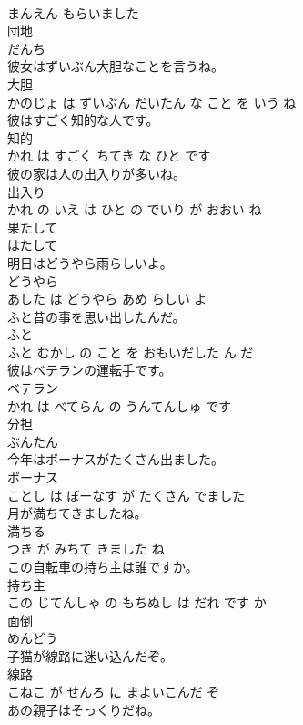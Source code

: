 \documentclass[8pt]{extreport}
\begin{document}
\begin{CJK}{UTF8}{min}
\\	まんえん もらいました			
\\	団地	
\\	だんち		
\\	彼女はずいぶん大胆なことを言うね。	
\\	大胆 
\\	かのじょ は ずいぶん だいたん な こと を いう ね			
\\	彼はすごく知的な人です。	
\\	知的 
\\	かれ は すごく ちてき な ひと です			
\\	彼の家は人の出入りが多いね。	
\\	出入り 
\\	かれ の いえ は ひと の でいり が おおい ね			
\\	果たして	
\\	はたして		
\\	明日はどうやら雨らしいよ。	
\\	どうやら 
\\	あした は どうやら あめ らしい よ			
\\	ふと昔の事を思い出したんだ。	
\\	ふと 
\\	ふと むかし の こと を おもいだした ん だ			
\\	彼はベテランの運転手です。	
\\	ベテラン 
\\	かれ は べてらん の うんてんしゅ です			
\\	分担	
\\	ぶんたん		
\\	今年はボーナスがたくさん出ました。	
\\	ボーナス 
\\	ことし は ぼーなす が たくさん でました			
\\	月が満ちてきましたね。	
\\	満ちる 
\\	つき が みちて きました ね			
\\	この自転車の持ち主は誰ですか。	
\\	持ち主 
\\	この じてんしゃ の もちぬし は だれ です か			
\\	面倒	
\\	めんどう		
\\	子猫が線路に迷い込んだぞ。	
\\	線路 
\\	こねこ が せんろ に まよいこんだ ぞ			
\\	あの親子はそっくりだね。	

\end{CJK}
\end{document}

